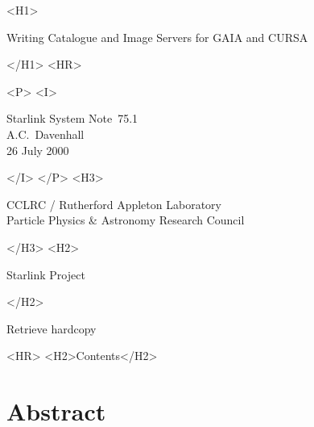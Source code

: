 \documentclass[twoside,11pt]{article}
\newcommand{\stardoccategory}  {Starlink System Note}
\newcommand{\stardocsource}    {ssn\stardocnumber}
\newcommand{\stardocnumber}    {75.1}
\newcommand{\stardocauthors}   {A.C.~Davenhall}
\newcommand{\stardocdate}      {26 July 2000}
\newcommand{\stardoctitle}     {Writing Catalogue and Image Servers for
GAIA and CURSA}
\newcommand{\htmladdnormallink}[2]{#1}
\newcommand{\htmladdimg}[1]{}
\newcommand{\htmlref}[2]{#1}
\newcommand{\htmladdtonavigation}[1]{}
\newcommand{\xlabel}[1]{}
\renewcommand{\_}{\texttt{\symbol{95}}}
\begin{document}
\begin{htmlonly}
   \xlabel{}
   \begin{rawhtml} <H1> \end{rawhtml}
      \stardoctitle
   \begin{rawhtml} </H1> <HR> \end{rawhtml}

   \begin{rawhtml} <P> <I> \end{rawhtml}
   \stardoccategory\ \stardocnumber \\
   \stardocauthors \\
   \stardocdate
   \begin{rawhtml} </I> </P> <H3> \end{rawhtml}
      \htmladdnormallink{CCLRC / Rutherford Appleton Laboratory}
                        {http://www.cclrc.ac.uk} \\
      \htmladdnormallink{Particle Physics \& Astronomy Research Council}
                        {http://www.pparc.ac.uk} \\
   \begin{rawhtml} </H3> <H2> \end{rawhtml}
      \htmladdnormallink{Starlink Project}{http://www.starlink.rl.ac.uk/}
   \begin{rawhtml} </H2> \end{rawhtml}
   \htmladdnormallink{\htmladdimg{source.gif} Retrieve hardcopy}
      {http://www.starlink.rl.ac.uk/cgi-bin/hcserver?\stardocsource}\\

  \label{stardoccontents}
  \begin{rawhtml} 
    <HR>
    <H2>Contents</H2>
  \end{rawhtml}
  \htmladdtonavigation{\htmlref{\htmladdimg{contents_motif.gif}}
        {stardoccontents}}

  \section{\xlabel{abstract}Abstract}

\end{htmlonly}
\end{document}
